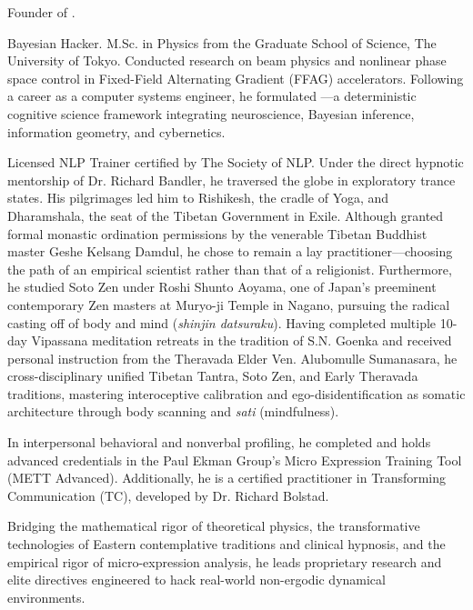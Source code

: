     Founder of \exSNLP.

    Bayesian Hacker. M.Sc. in Physics from the Graduate School of Science, The University of Tokyo. Conducted research on beam physics and nonlinear phase space control in Fixed-Field Alternating Gradient (FFAG) accelerators. Following a career as a computer systems engineer, he formulated \exSNLP---a deterministic cognitive science framework integrating neuroscience, Bayesian inference, information geometry, and cybernetics.

    Licensed NLP Trainer certified by The Society of NLP\texttrademark. Under the direct hypnotic mentorship of Dr. Richard Bandler, he traversed the globe in exploratory trance states. His pilgrimages led him to Rishikesh, the cradle of Yoga, and Dharamshala, the seat of the Tibetan Government in Exile. Although granted formal monastic ordination permissions by the venerable Tibetan Buddhist master Geshe Kelsang Damdul, he chose to remain a lay practitioner---choosing the path of an empirical scientist rather than that of a religionist. Furthermore, he studied Soto Zen under Roshi Shunto Aoyama, one of Japan's preeminent contemporary Zen masters at Muryo-ji Temple in Nagano, pursuing the radical casting off of body and mind (\textit{shinjin datsuraku}). Having completed multiple 10-day Vipassana meditation retreats in the tradition of S.N. Goenka and received personal instruction from the Theravada Elder Ven. Alubomulle Sumanasara, he cross-disciplinary unified Tibetan Tantra, Soto Zen, and Early Theravada traditions, mastering interoceptive calibration and ego-disidentification as somatic architecture through body scanning and \textit{sati} (mindfulness).

    In interpersonal behavioral and nonverbal profiling, he completed and holds advanced credentials in the Paul Ekman Group's Micro Expression Training Tool (METT Advanced). Additionally, he is a certified practitioner in Transforming Communication (TC), developed by Dr. Richard Bolstad.

    Bridging the mathematical rigor of theoretical physics, the transformative technologies of Eastern contemplative traditions and clinical hypnosis, and the empirical rigor of micro-expression analysis, he leads proprietary research and elite directives engineered to hack real-world non-ergodic dynamical environments.
\fi

